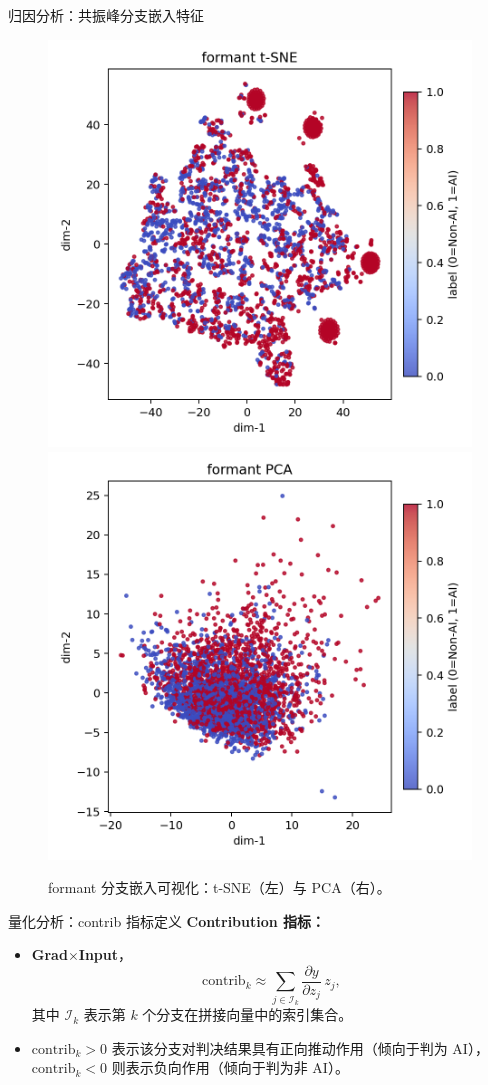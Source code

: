 \documentclass[aspectratio=169]{beamer}
\begin{document}
\begin{frame}{归因分析：共振峰分支嵌入特征}
\begin{figure}
  \centering
  \includegraphics[width=0.45\linewidth]{images_in_paper/embed_formant_tsne.png}
  \hfill
  \includegraphics[width=0.45\linewidth]{images_in_paper/embed_formant_pca.png}
  \caption{formant 分支嵌入可视化：t-SNE（左）与 PCA（右）。}
  \label{fig:formant_embed}
\end{figure}

\end{frame}



\begin{frame}{量化分析：contrib 指标定义}
\vspace{0.6em}
\textbf{Contribution 指标：}
\begin{itemize}
  \item \textbf{Grad$\times$Input}，
    \[
      \mathrm{contrib}_k \approx
      \sum_{j \in \mathcal{I}_k}
      \frac{\partial y}{\partial z_j}\, z_j,
    \]
    其中 $\mathcal{I}_k$ 表示第 $k$ 个分支在拼接向量中的索引集合。
  \item $\mathrm{contrib}_k > 0$ 表示该分支对判决结果具有正向推动作用（倾向于判为 AI），
        $\mathrm{contrib}_k < 0$ 则表示负向作用（倾向于判为非 AI）。
\end{itemize}
\end{frame}
\end{document}
